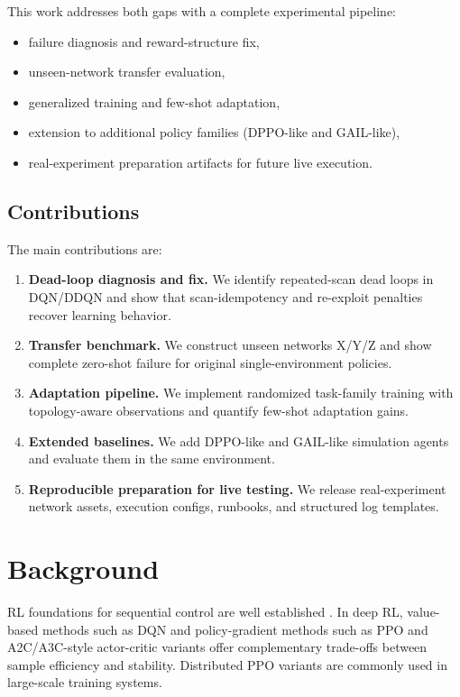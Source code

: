 \documentclass[conference]{IEEEtran}
\begin{document}
This work addresses both gaps with a complete experimental pipeline:
\begin{itemize}
    \item failure diagnosis and reward-structure fix,
    \item unseen-network transfer evaluation,
    \item generalized training and few-shot adaptation,
    \item extension to additional policy families (DPPO-like and GAIL-like),
    \item real-experiment preparation artifacts for future live execution.
\end{itemize}

\subsection{Contributions}
The main contributions are:
\begin{enumerate}
    \item \textbf{Dead-loop diagnosis and fix.} We identify repeated-scan dead loops in DQN/DDQN and show that scan-idempotency and re-exploit penalties recover learning behavior.
    \item \textbf{Transfer benchmark.} We construct unseen networks X/Y/Z and show complete zero-shot failure for original single-environment policies.
    \item \textbf{Adaptation pipeline.} We implement randomized task-family training with topology-aware observations and quantify few-shot adaptation gains.
    \item \textbf{Extended baselines.} We add DPPO-like and GAIL-like simulation agents and evaluate them in the same environment.
    \item \textbf{Reproducible preparation for live testing.} We release real-experiment network assets, execution configs, runbooks, and structured log templates.
\end{enumerate}

\section{Background}
RL foundations for sequential control are well established \cite{sutton2018}. In deep RL, value-based methods such as DQN \cite{mnih2015} and policy-gradient methods such as PPO \cite{schulman2017ppo} and A2C/A3C-style actor-critic variants \cite{mnih2016a3c} offer complementary trade-offs between sample efficiency and stability. Distributed PPO variants are commonly used in large-scale training systems.
\end{document}
